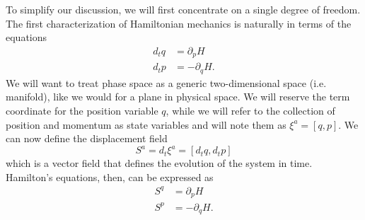 To simplify our discussion, we will first concentrate on a single degree of freedom. The first characterization of Hamiltonian mechanics is naturally in terms of the equations
\begin{equation}\label{rp-cm-hsd-condEquations}
	\tag{HM-1S}
	\begin{aligned}
		d_t q &= \partial_p H \\
		d_t p &= - \partial_q H.
	\end{aligned}
\end{equation}
We will want to treat phase space as a generic two-dimensional space (i.e. manifold), like we would for a plane in physical space. We will reserve the term coordinate for the position variable $q$, while we will refer to the collection of position and momentum as state variables and will note them as $\xi^a = [q, p]$. We can now define the displacement field
\begin{equation}\label{rp-cm-displacement1d}
	S^a = d_t \xi^a = [d_t q, d_t p]
\end{equation}
which is a vector field that defines the evolution of the system in time. Hamilton's equations, then, can be expressed as
\begin{equation}\label{rp-cm-hsd-displacementCurl}
	\begin{aligned}
		S^q &= \partial_p H \\
		S^p &= - \partial_q H.
	\end{aligned}
\end{equation}

